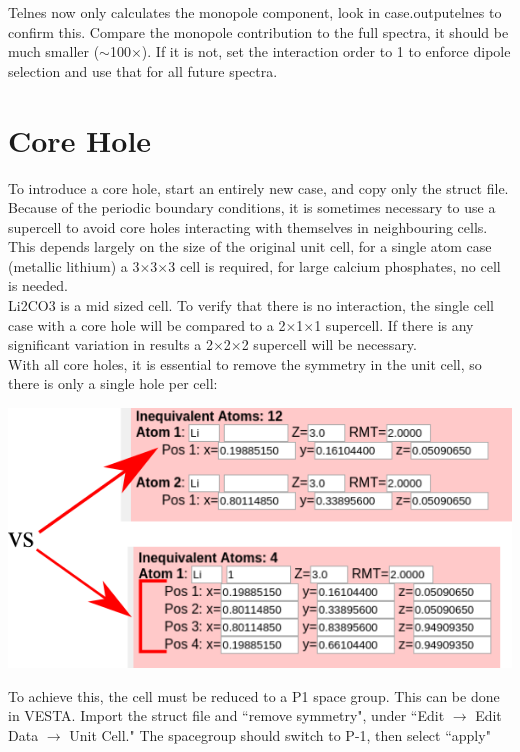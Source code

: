 \documentclass[12pt]{article}
\begin{document}
Telnes now only calculates the monopole component, look in case.outputelnes to confirm this.  Compare the monopole contribution to the full spectra, it should be much smaller ($\sim$100$\times$).  If it is not, set the interaction order to 1 to enforce dipole selection and use that for all future spectra.


\section{Core Hole}
To introduce a core hole, start an entirely new case, and copy only the struct file.  Because of the periodic boundary conditions, it is sometimes necessary to use a supercell to avoid core holes interacting with themselves in neighbouring cells. This depends largely on the size of the original unit cell, for a single atom case (metallic lithium) a 3$\times$3$\times$3 cell is required, for large calcium phosphates, no cell is needed. \\

Li2CO3 is a mid sized cell.  To verify that there is no interaction, the single cell case with a core hole will be compared to a 2$\times$1$\times$1 supercell.  If there is any significant variation in results a 2$\times$2$\times$2 supercell will be necessary.  \\

With all core holes, it is essential to remove the symmetry in the unit cell, so there is only a single hole per cell: 

\includegraphics[scale=0.5]{./images/isolated_struct.png}

To achieve this, the cell must be reduced to a P1 space group.  This can be done in VESTA.  Import the struct file and ``remove symmetry", under ``Edit $\to$  Edit Data $\to$ Unit Cell." The spacegroup should switch to P-1, then select ``apply" \\
\end{document}
